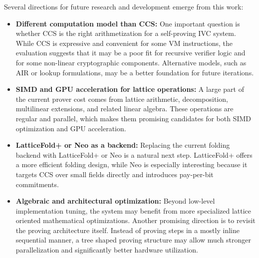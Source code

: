 Several directions for future research and development emerge from this work:

\begin{itemize}
	\item \textbf{Different computation model than CCS:} One important question is
	      whether CCS is the right arithmetization for a self-proving IVC system.
	      While CCS is expressive and convenient for some VM instructions, the
	      evaluation suggests that it may be a poor fit for recursive verifier
	      logic and for some non-linear cryptographic components. Alternative
	      models, such as AIR or lookup formulations, may be a better
	      foundation for future iterations.

	\item \textbf{SIMD and GPU acceleration for lattice operations:} A large part
	      of the current prover cost comes from lattice arithmetic, decomposition,
	      multilinear extensions, and related linear algebra. These operations are
	      regular and parallel, which makes them promising candidates for both
	      SIMD optimization and GPU acceleration.

	\item \textbf{LatticeFold+ or Neo as a backend:} Replacing the current folding
	      backend with LatticeFold+ \cite{LatticeFoldPlus} or Neo \cite{Neo} is a
	      natural next step. LatticeFold+ offers a more efficient folding design,
	      while Neo is especially interesting because it targets CCS over small
	      fields directly and introduces pay-per-bit commitments.

	\item \textbf{Algebraic and architectural optimization:} Beyond low-level
	      implementation tuning, the system may benefit from more specialized
	      lattice oriented mathematical optimizations. Another promising direction
	      is to revisit the proving architecture itself. Instead of proving steps in
	      a mostly inline sequential manner, a tree shaped proving structure may
	      allow much stronger parallelization and significantly better hardware
	      utilization.
\end{itemize}

